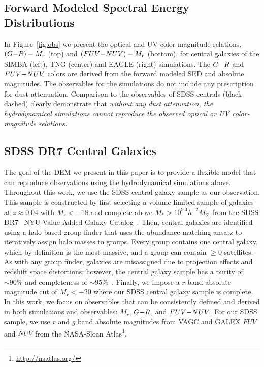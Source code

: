 \subsection{Forward Modeled Spectral Energy Distributions} \label{sec:fm} 

In Figure~\ref{fig:obs} we present the optical and UV color-magnitude
relations, $(G{-}R)-M_r$ (top) and $(FUV{-}NUV)-M_r$ (bottom), for central galaxies
of the SIMBA (left), TNG (center) and EAGLE (right) simulations. The $G{-}R$ and
$FUV{-}NUV$ colors are derived from the forward modeled SED and absolute magnitudes.
The observables for the simulations do not include any prescription for dust
attenuation. Comparison to the observables of SDSS centrals (black dashed) 
clearly demonstrate that {\em without any dust attenuation, the hydrodynamical 
simulations cannot reproduce the observed optical or UV color-magnitude
relations.}

\subsection{SDSS DR7 Central Galaxies} \label{sec:obs} 
The goal of the DEM we present in this paper is to provide a flexible model
that can reproduce observations using the hydrodynamical simulations above. 
Throughout this work, we use the \cite{tinker2011} SDSS central galaxy sample 
as our observation. This sample is constructed by first selecting a
volume-limited sample of galaxies at $z \approx 0.04$ with $M_r < -18$ and
complete above $M_* > 10^{9.4} h^{-2}M_\odot$ from the SDSS
DR7~\citep{abazajian2009} NYU Value-Added Galaxy Catalog~\citep[VAGC;][]{blanton2005}. 
Then, central galaxies are identified using a halo-based group finder that
uses the abundance matching ansatz to iteratively assign halo masses to groups.
Every group contains one central galaxy, which by definition is the most
massive, and a group can contain $\ge0$ satellites.  As with any group finder,
galaxies are misassigned due to projection effects and redshift space
distortions; however, the central galaxy sample has a purity of ${\sim}90\%$
and completeness of ${\sim}95\%$~\citep{tinker2018}. Finally, we impose a
$r$-band absolute magnitude cut of $M_r < -20$ where our SDSS central galaxy 
sample is complete. In this work, we focus on observables that can be 
consistently defined and derived in both simulations and observables: 
$M_r$, $G{-}R$, and $FUV{-}NUV$. For our SDSS sample, we use $r$ and $g$ band 
absolute magnitudes from VAGC and GALEX $FUV$ and $NUV$ from the
NASA-Sloan Atlas\footnote{\url{http://nsatlas.org/}}. 

